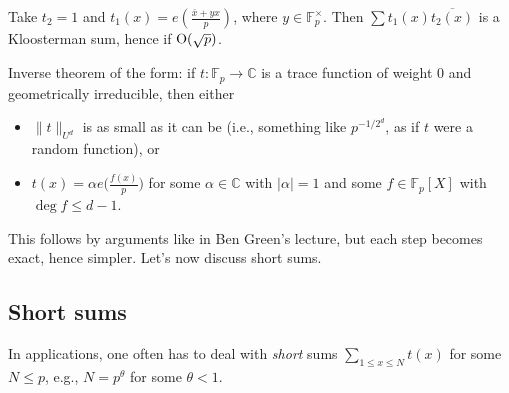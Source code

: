 \documentclass[reqno]{amsart} 
\numberwithin{theorem}{section}
\numberwithin{equation}{section}
\begin{document}
\begin{example}
  Take $t_2 = 1$ and $t_1(x) = e(\tfrac{\bar{x} + y x}{p})$, where $y \in \mathbb{F}_p^\times$.  Then $\sum t_1(x) \overline{t_2(x)}$ is a Kloosterman sum, hence if $\operatorname{O}(\sqrt{p})$.
\end{example}

\begin{example}
  Inverse theorem of the form: if $t : \mathbb{F}_p \rightarrow \mathbb{C}$ is a trace function of weight $0$ and geometrically irreducible, then either
  \begin{itemize}
  \item $\lVert t \rVert_{U^d}$ is as small as it can be (i.e., something like $p^{- 1/2^d}$, as if $t$ were a random function), or
  \item $t(x) = \alpha e \bigl( \tfrac{f(x)}{p} \bigr)$ for some $\alpha \in \mathbb{C}$ with $\lvert \alpha \rvert = 1$ and some $f \in \mathbb{F}_p[X]$ with $\deg f \leq d - 1$.
  \end{itemize}
  This follows by arguments like in Ben Green's lecture, but each step becomes exact, hence simpler.  Let's now discuss short sums.
\end{example}

\subsection{Short sums}

In applications, one often has to deal with \emph{short} sums $\sum_{1 \leq x \leq N} t(x)$ for some $N \leq p$, e.g., $N = p^\theta$ for some $\theta < 1$.
\end{document}
